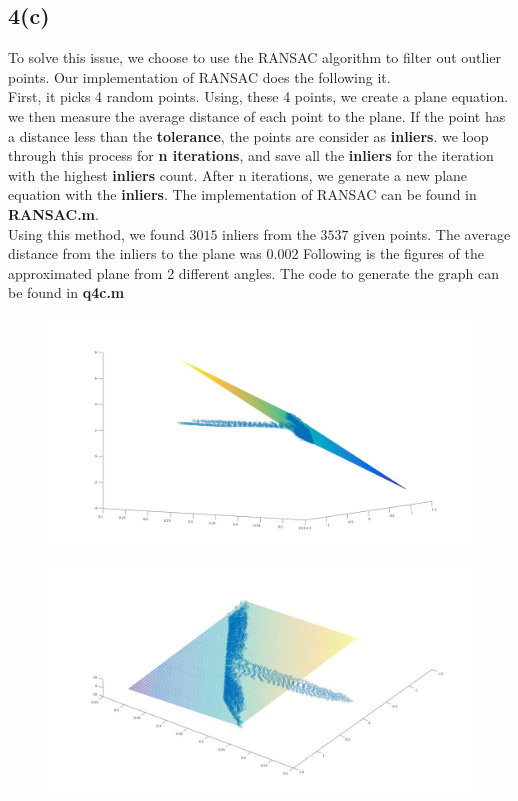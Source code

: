 \documentclass{article}
\begin{document}
\subsection*{4(c)}
To solve this issue, we choose to use the RANSAC algorithm to filter out outlier points. Our implementation of RANSAC does the following it.\\
First, it picks 4 random points. Using, these 4 points, we create a plane equation. we then measure the average distance of each point to the plane. If the point has a distance less than the \textbf{tolerance}, the points are consider as \textbf{inliers}. we loop through this process for \textbf{n iterations}, and save all the \textbf{inliers} for the iteration with the highest \textbf{inliers} count. After n iterations, we generate a new plane equation with the \textbf{inliers}. The implementation of RANSAC can be found in \textbf{RANSAC.m}.\\
Using this method, we found $3015$ inliers from the $3537$ given points. The average distance from the inliers to the plane was $0.002$ Following is the figures of the approximated plane from 2 different angles. The code to generate the graph can be found in \textbf{q4c.m}
\begin{figure}[H]
\centering
\includegraphics[width=5in]{figures/q4c.jpg}
\end{figure}
\begin{figure}[H]
\centering
\includegraphics[width=5in]{figures/q4c-alt.jpg}
\end{figure}
\end{document}

